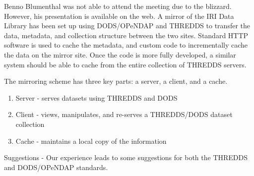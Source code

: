 Benno Blumenthal was not able to attend the meeting due to the
blizzard.  However, his presentation is available on the web.  A
mirror of the \ac{IRI} Data Library has been set up using
\ac{DODS}/\ac{OPeNDAP} and \ac{THREDDS} to transfer the data,
metadata, and collection structure between the two sites.  Standard
\ac{HTTP} software is used to cache the metadata, and custom code to
incrementally cache the data on the mirror site. Once the code is more
fully developed, a similar system should be able to cache from the
entire collection of \ac{THREDDS} servers.

The mirroring scheme has three key parts: a server, a client, and a cache. 

\begin{enumerate}
  \item Server - serves datasets using \ac{THREDDS} and \ac{DODS} 
  \item Client - views, manipulates, and re-serves a \ac{THREDDS}/\ac{DODS} 
        dataset collection 
  \item Cache - maintains a local copy of the information 
\end{enumerate}

Suggestions - Our experience leads to some suggestions for both the 
\ac{THREDDS} and \ac{DODS}/\ac{OPeNDAP} standards. 

